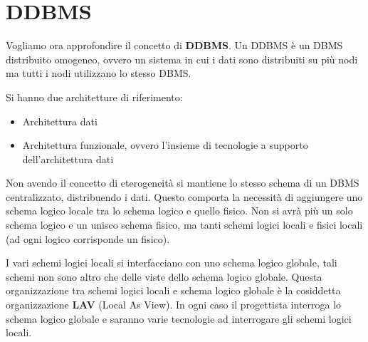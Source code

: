 \section{DDBMS}
Vogliamo ora approfondire il concetto di \textbf{DDBMS}. Un DDBMS è un DBMS
distribuito omogeneo, ovvero un sistema in cui i dati sono distribuiti su più
nodi ma tutti i nodi utilizzano lo stesso DBMS.

Si hanno due architetture di riferimento:
\begin{itemize}
    \item Architettura dati
    \item Architettura funzionale, ovvero l'insieme di tecnologie a supporto
          dell'architettura dati
\end{itemize}

Non avendo il concetto di eterogeneità si mantiene lo stesso schema di un DBMS
centralizzato, distribuendo i dati. Questo comporta la necessità di aggiungere
uno schema logico locale tra lo schema logico e quello fisico. Non si avrà più
un solo schema logico e un unisco schema fisico, ma tanti schemi logici locali e
fisici locali (ad ogni logico corrisponde un fisico).

I vari schemi logici locali si interfacciano con uno schema logico globale,
tali schemi non sono altro che delle viste dello schema logico globale. Questa
organizzazione tra schemi logici locali e schema logico globale è la cosiddetta
organizzazione \textbf{LAV} (Local As View). In ogni caso il progettista interroga
lo schema logico globale e saranno varie tecnologie ad interrogare gli schemi
logici locali.

